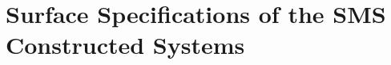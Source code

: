 \begin{comment}
\definecolor{grey1}{gray}{0.6}
\definecolor{grey2}{gray}{0.9}
\taburowcolors[2]{grey2..grey1}
\begin{longtabu}{*{5}{>{\scriptsize}X[c]}}
    \caption{Test table}
    \\ \hline 
     \textbf{Surface \#} & \textbf{Surface Type} & \textbf{Curvature (1/mm)} & \textbf{Thickness (mm)} & \textbf{Glass Type*}  \\ 
     \midrule
     \endhead
     \show
                                            \textbf{1 (Object)} & Sphere & 0 & Infinity &    \\ 
    										\textbf{2}              & Sphere & -0.2636 & 2.2391 & LITHOSILQ\_SCHOTT   \\
                                            \textbf{3}               & Asphere & 0.1011& 0.6631 &  \\
                                            \textbf{4}              & Sphere & -0.0222 & 6.0000 & LITHOSILQ\_SCHOTT    \\ 
                                            \textbf{5}               &Asphere  & -0.0809  & 0.1000 &  \\
                                           \textbf{6}               & Sphere  & 0.0113 & 5.9871  & LITHOSILQ\_SCHOTT  \\
                                          \textbf{7}                & Sphere & -0.0894 & 0.1000 & \\ 
                                          \textbf{8}                & Sphere  & 0.0504  & 1.8479 &  LITHOSILQ\_SCHOTT \\
   									      \textbf{9}                & Sphere  & -0.0084  &  0.1000 &     \\
                                          \textbf{10}                & Sphere  & 0.0918 & 1.8339 & LITHOSILQ\_SCHOTT  \\
    \hline
    \multicolumn{5}{l}{\textit{\footnotesize{* The glasses are from the SCHOTT catalog in CODE V. }}}\\
\end{longtabu}


\newpage
\end{comment}
\section{Surface Specifications of the SMS Constructed Systems} 
\label{apdx: chapter-5-system-spec}

